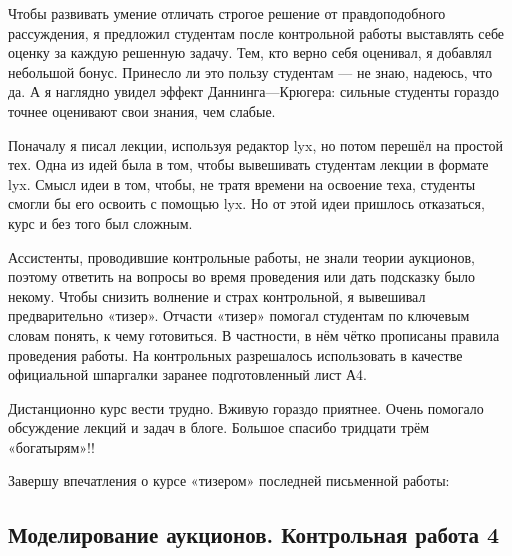 \documentclass[11pt, openany]{book}
\numberwithin{equation}{page} %
\theoremstyle{definition} %
\theoremstyle{definition}
\theoremstyle{definition}
\begin{document}
Чтобы развивать умение отличать строгое решение от правдоподобного рассуждения, я предложил студентам после контрольной работы выставлять себе оценку за каждую решенную задачу. Тем, кто верно себя оценивал, я добавлял небольшой бонус. Принесло ли это пользу студентам — не знаю, надеюсь, что да. А я наглядно увидел эффект Даннинга—Крюгера: сильные студенты гораздо точнее оценивают свои знания, чем слабые.

Поначалу я писал лекции, используя редактор lyx, но потом перешёл на простой тех. Одна из идей была в том, чтобы вывешивать студентам лекции в формате lyx. Смысл идеи в том, чтобы, не тратя времени на освоение теха, студенты смогли бы его освоить с помощью lyx. Но от этой идеи пришлось отказаться, курс и без того был сложным.

Ассистенты, проводившие контрольные работы, не знали теории аукционов, поэтому ответить на вопросы во время проведения или дать подсказку было некому. Чтобы снизить волнение и страх контрольной, я вывешивал предварительно «тизер». Отчасти «тизер» помогал студентам по ключевым словам понять, к чему готовиться. В частности, в нём чётко прописаны правила проведения работы. На контрольных разрешалось использовать в качестве официальной шпаргалки заранее подготовленный лист А4.

Дистанционно курс вести трудно. Вживую гораздо приятнее. Очень помогало обсуждение лекций и задач в блоге. Большое спасибо тридцати трём «богатырям»!!

Завершу впечатления о курсе «тизером» последней письменной работы:

\subsection*{Моделирование аукционов. Контрольная работа 4}
\end{document}
